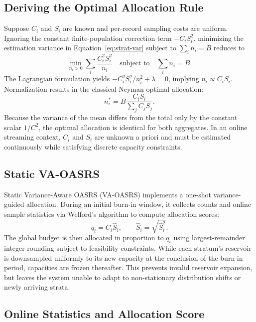 \documentclass[conference]{IEEEtran}
\begin{document}
\subsection{Deriving the Optimal Allocation Rule}

Suppose $C_i$ and $S_i$ are known and per-record sampling costs are uniform. Ignoring the constant finite-population correction term $-C_iS_i^2$, minimizing the estimation variance in Equation~\ref{eq:strat-var} subject to $\sum_i n_i=B$ reduces to
\begin{equation}
 \min_{n_i>0}\sum_i\frac{C_i^2S_i^2}{n_i}
 \quad\text{subject to}\quad \sum_i n_i=B.
\end{equation}
The Lagrangian formulation yields $-C_i^2S_i^2/n_i^2+\lambda=0$, implying $n_i\propto C_iS_i$. Normalization results in the classical Neyman optimal allocation:
\begin{equation}
 n_i^*=B\frac{C_iS_i}{\sum_j C_jS_j}.
 \label{eq:neyman}
\end{equation}
Because the variance of the mean differs from the total only by the constant scalar $1/C^2$, the optimal allocation is identical for both aggregates. In an online streaming context, $C_i$ and $S_i$ are unknown a priori and must be estimated continuously while satisfying discrete capacity constraints.

\subsection{Static VA-OASRS}

Static Variance-Aware OASRS (VA-OASRS) implements a one-shot variance-guided allocation. During an initial burn-in window, it collects counts and online sample statistics via Welford's algorithm to compute allocation scores:
\begin{equation}
 q_i=C_i\widehat{S}_i,\qquad \widehat{S}_i=\sqrt{\widehat{S}_i^2}.
 \label{eq:static-score}
\end{equation}
The global budget is then allocated in proportion to $q_i$ using largest-remainder integer rounding subject to feasibility constraints. While each stratum's reservoir is downsampled uniformly to its new capacity at the conclusion of the burn-in period, capacities are frozen thereafter. This prevents invalid reservoir expansion, but leaves the system unable to adapt to non-stationary distribution shifts or newly arriving strata.

\subsection{Online Statistics and Allocation Score}
\end{document}

